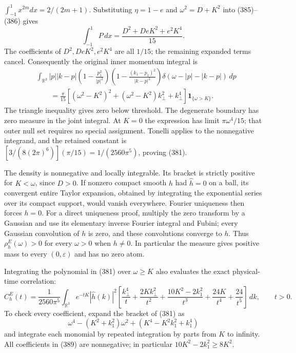 \documentclass[
  11pt,
]{article}
\begin{document}
\(\int_{-1}^1x^{2m}dx=2/(2m+1)\). Substituting \(\eta=1-e\) and
\(\omega^2=D+K^2\) into (385)--(386) gives \[
 \int_{-1}^1P\,dx=\frac{D^2+DeK^2+e^2K^4}{15}.
 \tag{387}
\] The coefficients of \(D^2,DeK^2,e^2K^4\) are all \(1/15\); the
remaining expanded terms cancel. Consequently the original inner
momentum integral is \[
 \begin{split}
 &\int_{\mathbb R^3}|p||k-p|
 \left(1-\frac{p_1^2}{|p|^2}\right)
 \left(1-\frac{(k_1-p_1)^2}{|k-p|^2}\right)
 \delta(\omega-|p|-|k-p|)\,dp\\
 &\qquad=\frac{\pi}{15}
       [(\omega^2-K^2)^2+(\omega^2-K^2)k_\perp^2+k_\perp^4]
       \mathbf1_{\{\omega>K\}}.
 \end{split}
 \tag{388}
\] The triangle inequality gives zero below threshold. The degenerate
boundary has zero measure in the joint integral. At \(K=0\) the
expression has limit \(\pi\omega^4/15\); that outer null set requires no
special assignment. Tonelli applies to the nonnegative integrand, and
the retained constant is \([3/(8(2\pi)^6)](\pi/15)=1/(2560\pi^5)\),
proving (381).

The density is nonnegative and locally integrable. Its bracket is
strictly positive for \(K<\omega\), since \(D>0\). If nonzero compact
smooth \(h\) had \(\widehat h=0\) on a ball, its convergent entire
Taylor expansion, obtained by integrating the exponential series over
its compact support, would vanish everywhere. Fourier uniqueness then
forces \(h=0\). For a direct uniqueness proof, multiply the zero
transform by a Gaussian and use its elementary inverse Fourier integral
and Fubini; every Gaussian convolution of \(h\) is zero, and these
convolutions converge to \(h\). Thus \(\rho^E_h(\omega)>0\) for every
\(\omega>0\) when \(h\ne0\). In particular the measure gives positive
mass to every \((0,\varepsilon)\) and has no zero atom.

Integrating the polynomial in (381) over \(\omega\ge K\) also evaluates
the exact physical-time correlation: \[
 \boxed{
 C^E_h(t)=\frac1{2560\pi^5}
 \int_{\mathbb R^3}e^{-tK}|\widehat h(k)|^2
 \left[
 \frac{k_\perp^4}{t}+
 \frac{2Kk_\perp^2}{t^2}+
 \frac{10K^2-2k_1^2}{t^3}+
 \frac{24K}{t^4}+\frac{24}{t^5}
 \right]\,dk,\qquad t>0 .
 }
 \tag{389}
\] To check every coefficient, expand the bracket of (381) as \[
 \omega^4-(K^2+k_1^2)\omega^2+
                    (K^4-K^2k_1^2+k_1^4)
 \tag{390}
\] and integrate each monomial by repeated integration by parts from
\(K\) to infinity. All coefficients in (389) are nonnegative; in
particular \(10K^2-2k_1^2\ge8K^2\).
\end{document}
